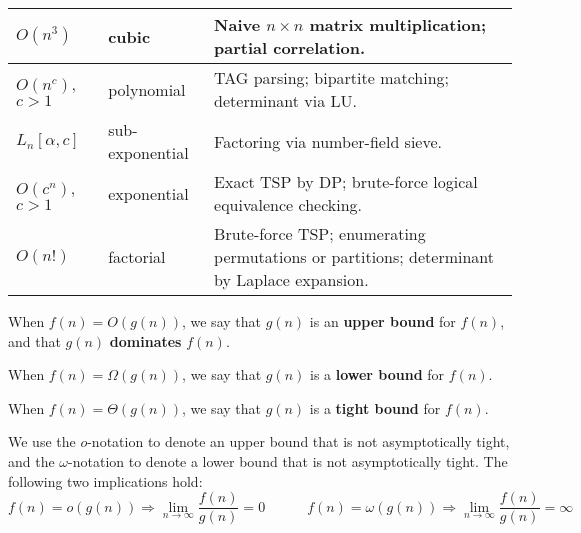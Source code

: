 \begin{table}[htb]
\begin{tabularx}{\columnwidth}{%
        |>{\RaggedRight\arraybackslash}p{}%
        |>{\RaggedRight\arraybackslash}p{}%
        |>{\small\RaggedRight\arraybackslash}X| }
      \hline
        $O(n^3)$
            & cubic
            & Naive $n\times n$ matrix multiplication; partial correlation. \\
        \hline
      $O(n^c)$, $c>1$
        & polynomial
        & TAG parsing; bipartite matching; determinant via LU. \\
      \hline
        $L_{n}[\alpha, c]$
        & sub-exponential
        & Factoring via number-field sieve. \\
      \hline
      $O(c^n)$, $c>1$
        & exponential
        & Exact TSP by DP; brute-force logical equivalence checking. \\
      \hline
      $O(n!)$
        & factorial
        & Brute-force TSP; enumerating permutations or partitions; determinant by Laplace expansion. \\
      \hline
    \end{tabularx}
  \end{table}

        
When $f(n) = O(g(n))$, we say that $g(n)$ is an \textbf{upper bound} for $f(n)$, and that $g(n)$ \textbf{dominates} $f(n)$.

When $f(n) = \Omega(g(n))$, we say that $g(n)$ is a \textbf{lower bound} for $f(n)$.

When $f(n) = \Theta(g(n))$, we say that $g(n)$ is a \textbf{tight bound} for $f(n)$.

We use the $o$-notation to denote an upper bound that is not asymptotically tight, and the $\omega$-notation to denote a lower bound that is not asymptotically tight.
The following two implications hold:
\[
f(n) = o(g(n)) \Rightarrow \lim_{n \to \infty} \frac{f(n)}{g(n)} = 0
\qquad \quad
f(n) = \omega(g(n)) \Rightarrow \lim_{n \to \infty} \frac{f(n)}{g(n)} = \infty
\]



